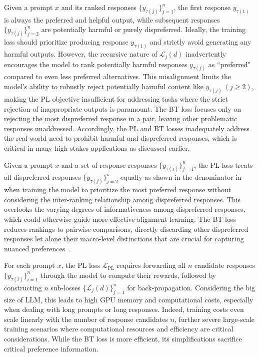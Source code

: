  Given a prompt \(x\) and its ranked responses \(\{y_{\tau(j)}\}_{j=1}^n\), the first response \(y_{\tau(1)}\) is always the preferred and helpful output, while subsequent responses \(\{y_{\tau(j)}\}_{j=2}^n\) are potentially harmful or purely dispreferred. Ideally, the training loss should prioritize producing response \(y_{\tau(1)}\) and strictly avoid generating any harmful outputs. However, the recursive nature of \(\mathcal{L}_{j}(d)\) inadvertently encourages the model to rank potentially harmful responses \(y_{\tau(j)}\) as ``preferred" compared to even less preferred alternatives. This misalignment limits the model's ability to robustly reject  potentially harmful content like  \(y_{\tau(j)} \ (j\geq 2)\), making the PL objective insufficient for addressing tasks where the strict rejection of inappropriate outputs is paramount.   The BT loss  focuses only on rejecting the most dispreferred response in a pair, leaving other problematic responses unaddressed.  Accordingly, the PL and BT  losses inadequately address the real-world need to prohibit harmful and  dispreferred responses, which is critical in many high-stakes applications as discussed earlier.  
 
 Given a prompt \(x\) and a set of response responses \(\{y_{\tau(j)}\}_{j=1}^n\), the PL loss treats all dispreferred responses \(\{y_{\tau(j)}\}_{j=2}^n\) equally as shown  in the denominator in  when training the model to prioritize the most preferred response without considering the inter-ranking relationship among dispreferred responses.  This overlooks the varying degrees of informativeness among dispreferred responses, which could otherwise guide more effective alignment learning.  The BT loss reduces rankings to pairwise comparisons, directly  discarding other dispreferred responses let alone their macro-level distinctions that are crucial for capturing nuanced preferences~\cite{sun2024rethinking, pro}.
 
 
 

 
 
 
   For each prompt \(x\), the PL loss  \(\mathcal{L}_{\text{PL}}\) requires forwarding all \(n\) candidate responses \(\{y_{\tau(i)}\}_{i=1}^n\)  through the model to compute their rewards, followed by constructing \(n\) sub-losses \(\{\mathcal{L}_{j}(d)\}_{j=1}^{n}\) for back-propagation. Considering the big size of LLM, this  leads to high GPU memory and computational costs, especially  when dealing with long prompts or long responses. Indeed,  training costs  even scale linearly with the number of response candidates \(n\), further severe  large-scale training scenarios where computational resources and efficiency are critical considerations.  While the BT loss is more efficient, its simplifications sacrifice critical preference information. 
 

